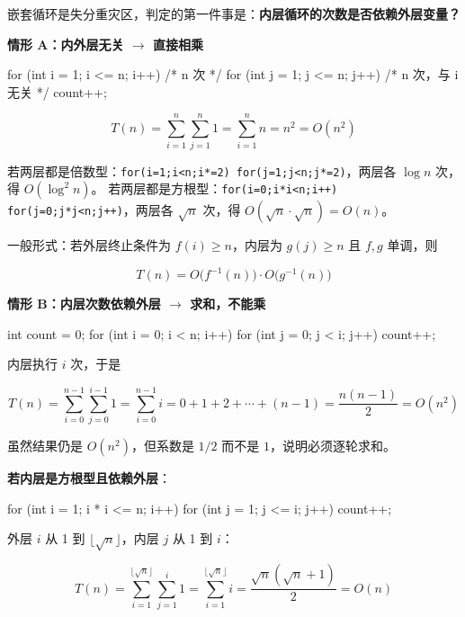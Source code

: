 \documentclass[11pt,openany,UTF8]{ctexbook}
\begin{document}
嵌套循环是失分重灾区，判定的第一件事是：\textbf{内层循环的次数是否依赖外层变量？}

\textbf{情形 A：内外层无关 $\to$ 直接相乘}

\begin{codebox}
for (int i = 1; i <= n; i++)         /* n 次 */
    for (int j = 1; j <= n; j++)     /* n 次，与 i 无关 */
        count++;
\end{codebox}

\[T(n)=\sum_{i=1}^{n}\sum_{j=1}^{n}1=\sum_{i=1}^{n}n=n^2=O(n^2)\]

若两层都是倍数型：\texttt{for(i=\allowbreak{}1;\allowbreak{}i<\allowbreak{}n;\allowbreak{}i*=\allowbreak{}2)\allowbreak{} for(j=\allowbreak{}1;\allowbreak{}j<\allowbreak{}n;\allowbreak{}j*=\allowbreak{}2)\allowbreak{}}，两层各 $\log n$ 次，得 $O(\log^2 n)$。 若两层都是方根型：\texttt{for(i=\allowbreak{}0;\allowbreak{}i*i<\allowbreak{}n;\allowbreak{}i+\allowbreak{}+\allowbreak{})\allowbreak{} for(j=\allowbreak{}0;\allowbreak{}j*j<\allowbreak{}n;\allowbreak{}j+\allowbreak{}+\allowbreak{})\allowbreak{}}，两层各 $\sqrt{n}$ 次，得 $O(\sqrt{n}\cdot\sqrt{n})=O(n)$。

一般形式：若外层终止条件为 $f(i)\ge n$，内层为 $g(j)\ge n$ 且 $f,g$ 单调，则

\[T(n)=O\big(f^{-1}(n)\big)\cdot O\big(g^{-1}(n)\big)\]

\textbf{情形 B：内层次数依赖外层 $\to$ 求和，不能乘}

\begin{codebox}
int count = 0;
for (int i = 0; i < n; i++)
    for (int j = 0; j < i; j++)
        count++;
\end{codebox}

内层执行 $i$ 次，于是

\[T(n)=\sum_{i=0}^{n-1}\sum_{j=0}^{i-1}1=\sum_{i=0}^{n-1} i = 0+1+2+\cdots+(n-1)=\frac{n(n-1)}{2}=O(n^2)\]

虽然结果仍是 $O(n^2)$，但系数是 $1/2$ 而不是 $1$，说明必须逐轮求和。

\textbf{若内层是方根型且依赖外层}：

\begin{codebox}
for (int i = 1; i * i <= n; i++)
    for (int j = 1; j <= i; j++)
        count++;
\end{codebox}

外层 $i$ 从 1 到 $\lfloor\sqrt{n}\rfloor$，内层 $j$ 从 1 到 $i$：

\[T(n)=\sum_{i=1}^{\lfloor\sqrt{n}\rfloor}\sum_{j=1}^{i}1=\sum_{i=1}^{\lfloor\sqrt{n}\rfloor} i=\frac{\sqrt{n}(\sqrt{n}+1)}{2}=O(n)\]
\end{document}
